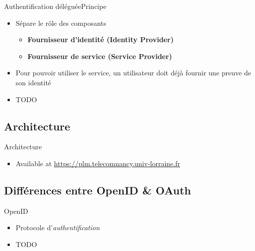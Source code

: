 \documentclass{beamer}
\begin{document}
\begin{frame}{Authentification déléguée}{Principe}
  \begin{center}
    \begin{itemize}
      \item Sépare le rôle des composants
      \begin{itemize}
        \item \textbf{Fournisseur d'identité (Identity Provider)}
        \item \textbf{Fournisseur de service (Service Provider)}
      \end{itemize}
      \item Pour pouvoir utiliser le service, un utilisateur doit déjà fournir une preuve de son identité
      \item TODO
    \end{itemize}
  \end{center}
\end{frame}

\subsection{Architecture}

\begin{frame}{Architecture}
  \begin{center}
    \begin{itemize}
    \item Available at \url{https://plm.telecomnancy.univ-lorraine.fr}
    \end{itemize}
  \end{center}
\end{frame}

\subsection{Différences entre OpenID \& OAuth}

\begin{frame}{OpenID}
  \begin{center}
    \begin{itemize}
      \item Protocole d'\emph{authentification}
      \item TODO
    \end{itemize}
  \end{center}
\end{frame}
\end{document}
